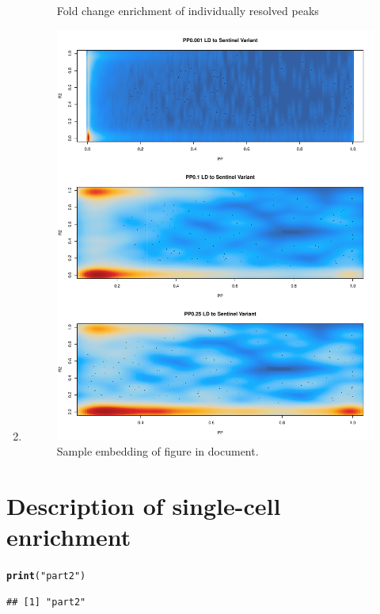 \documentclass{article}\usepackage[]{graphicx}\usepackage[]{color}
\makeatletter
\newcommand{\hlstr}[1]{\textcolor[rgb]{0.192,0.494,0.8}{#1}}%
\newcommand{\hlstd}[1]{\textcolor[rgb]{0.345,0.345,0.345}{#1}}%
\newcommand{\hlkwd}[1]{\textcolor[rgb]{0.737,0.353,0.396}{\textbf{#1}}}%
\newenvironment{kframe}{%
 \def\at@end@of@kframe{}%
 \ifinner\ifhmode%
  \def\at@end@of@kframe{\end{minipage}}%
  \begin{minipage}{\columnwidth}%
 \fi\fi%
 \def\FrameCommand##1{\hskip\@totalleftmargin \hskip-\fboxsep
 \colorbox{shadecolor}{##1}\hskip-\fboxsep
     \hskip-\linewidth \hskip-\@totalleftmargin \hskip\columnwidth}%
 \MakeFramed {\advance\hsize-\width
   \@totalleftmargin\z@ \linewidth\hsize
   \@setminipage}}%
 {\par\unskip\endMakeFramed%
 \at@end@of@kframe}
\newenvironment{knitrout}{}{} %
\makeatother
\begin{document}
\begin{enumerate}[label=(\Alph*)]
\begin{knitrout}
\begin{figure}[H]
{}

\caption[Fold change enrichment of individually resolved peaks]{Fold change enrichment of individually resolved peaks}\label{fig:correlationPlots3}
\end{figure}


\end{knitrout}
\item

\begin{figure}[H]
\centering
\includegraphics[width=\linewidth]{staticFigures/LDtoSentinel_PPcomparison.pdf}
\caption{Sample embedding of figure in document.}
\end{figure} 

\end{enumerate}



\section*{Description of single-cell enrichment}

\begin{knitrout}
\color{fgcolor}\begin{kframe}
\begin{alltt}
\hlkwd{print}\hlstd{(}\hlstr{"part2"}\hlstd{)}
\end{alltt}
\begin{verbatim}
## [1] "part2"
\end{verbatim}
\end{kframe}
\end{knitrout}
\end{document}
